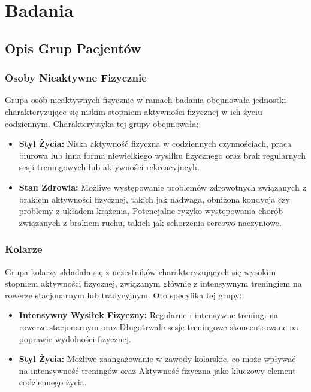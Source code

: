 \chapter{Badania}
\section{Opis Grup Pacjentów}
\subsection{Osoby Nieaktywne Fizycznie}
Grupa osób nieaktywnych fizycznie w ramach badania obejmowała jednostki charakteryzujące się niskim stopniem aktywności fizycznej w ich życiu codziennym. Charakterystyka tej grupy obejmowała:
\begin{itemize}
    \item \textbf{Styl Życia: } Niska aktywność fizyczna w codziennych czynnościach, praca biurowa lub inna forma niewielkiego wysiłku fizycznego oraz brak regularnych sesji treningowych lub aktywności rekreacyjncyh.
    \item \textbf{Stan Zdrowia: } Możliwe występowanie problemów zdrowotnych związanych z brakiem aktywności fizycznej, takich jak nadwaga, obniżona kondycja czy problemy z układem krążenia, Potencjalne ryzyko występowania chorób związanych z brakiem ruchu, takich jak schorzenia sercowo-naczyniowe.
\end{itemize}
\subsection{Kolarze}
Grupa kolarzy składała się z uczestników charakteryzujących się wysokim stopniem aktywności fizycznej, związanym głównie z intensywnym treningiem na rowerze stacjonarnym lub tradycyjnym. Oto specyfika tej grupy:
\begin{itemize}
    \item \textbf{Intensywny Wysiłek Fizyczny: } Regularne i intensywne treningi na rowerze stacjonarnym oraz Długotrwałe sesje treningowe skoncentrowane na poprawie wydolności fizycznej.
    \item \textbf{Styl Życia: } Możliwe zaangażowanie w zawody kolarskie, co może wpływać na intensywność treningów oraz Aktywność fizyczna jako kluczowy element codziennego życia.
\end{itemize}
